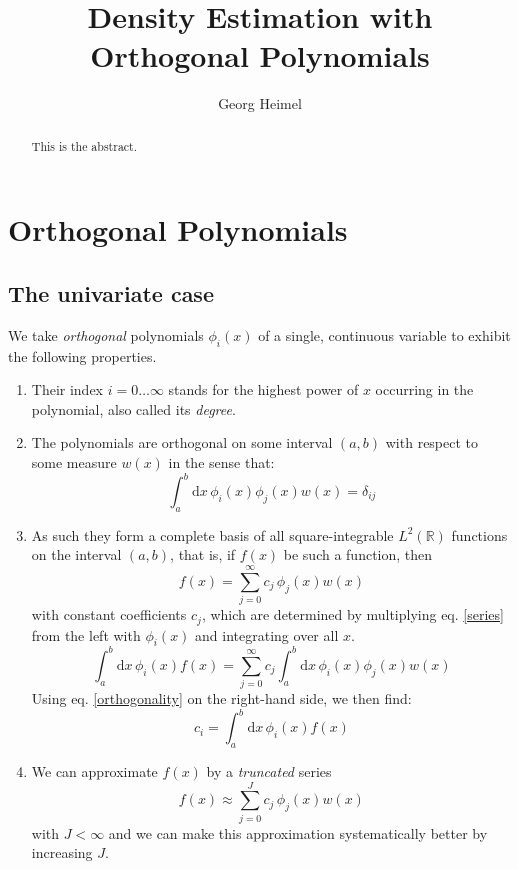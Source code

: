\documentclass[]{report}
\title{Density Estimation with Orthogonal Polynomials}
\author{Georg Heimel}
\begin{document}
\maketitle

\begin{abstract}
	This is the abstract.
\end{abstract}

\chapter{Orthogonal Polynomials}
	\section{The univariate case}
	We take \emph{orthogonal} polynomials $\phi_i(x)$ of a single, continuous variable to exhibit the following properties.
	\begin{enumerate}
		\item Their index $i=0\ldots\infty$ stands for the highest power of $x$ occurring in the polynomial, also called its \emph{degree}.
		\item The polynomials are orthogonal on some interval $(a, b)$ with respect to some measure $w(x)$ in the sense that:
		\begin{equation}\label{orthogonality}
			\int_a^b\mathrm{d}x\,\phi_i(x)\phi_j(x)w(x) = \delta_{ij}
		\end{equation}
		\item As such they form a complete basis of all square-integrable $L^2(\mathbb{R})$ functions on the interval $(a, b)$, that is, if $f(x)$ be such a function, then
		\begin{equation}\label{series}
			f(x)=\sum_{j=0}^{\infty}c_j\,\phi_j(x)w(x)
		\end{equation}
		with constant coefficients $c_j$, which are determined by multiplying eq. \ref{series} from the left with $\phi_i(x)$ and integrating over all $x$.
		\begin{equation*}
			\int_a^b\mathrm{d}x\,\phi_i(x)f(x) = \sum_{j=0}^{\infty}c_j\int_a^b\mathrm{d}x\,\phi_i(x)\phi_j(x)w(x)
		\end{equation*}
		Using eq. \ref{orthogonality} on the right-hand side, we then find:
		\begin{equation}
			c_i=\int_a^b\mathrm{d}x\,\phi_i(x)f(x)
		\end{equation}
		\item We can approximate $f(x)$ by a \emph{truncated} series
		\begin{equation}\label{trunc_series}
			f(x)\approx\sum_{j=0}^{J}c_j\,\phi_j(x)w(x)
		\end{equation}
		with $J < \infty$ and we can make this approximation systematically better by increasing $J$.
	\end{enumerate}
	
\end{document}
